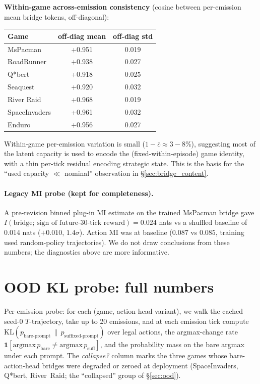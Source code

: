 \documentclass[11pt]{article}
\begin{document}
\smallskip\noindent\textbf{Within-game across-emission consistency} (cosine between per-emission mean bridge tokens, off-diagonal):

\smallskip\noindent
\begin{tabular}{lcc}
\toprule
Game & off-diag mean & off-diag std \\
\midrule
MsPacman      & +0.951 & 0.019 \\
RoadRunner    & +0.938 & 0.027 \\
Q*bert        & +0.918 & 0.025 \\
Seaquest      & +0.920 & 0.032 \\
River Raid    & +0.968 & 0.019 \\
SpaceInvaders & +0.961 & 0.032 \\
Enduro        & +0.956 & 0.027 \\
\bottomrule
\end{tabular}\smallskip

Within-game per-emission variation is small ($1{-}\bar{c}\approx 3{-}8\%$), suggesting most of the latent capacity is used to encode the (fixed-within-episode) game identity, with a thin per-tick residual encoding strategic state. This is the basis for the ``used capacity $\ll$ nominal'' observation in \S\ref{sec:bridge_content}.

\paragraph{Legacy MI probe (kept for completeness).} A pre-revision binned plug-in MI estimate on the trained MsPacman bridge gave $I(\text{bridge};\,\text{sign of future-30-tick reward})=0.024$ nats vs a shuffled baseline of 0.014 nats ($+0.010$, $1.4\sigma$). Action MI was at baseline ($0.087$ vs $0.085$, training used random-policy trajectories). We do not draw conclusions from these numbers; the diagnostics above are more informative.

\section{OOD KL probe: full numbers}
\label{app:ood_kl}

Per-emission probe: for each (game, action-head variant), we walk the cached seed-0 $T$-trajectory, take up to 20 emissions, and at each emission tick compute $\mathrm{KL}\!\left(p_{\text{bare-prompt}} \,\|\, p_{\text{suffixed-prompt}}\right)$ over legal actions, the argmax-change rate $\mathbf{1}\!\left[\mathrm{argmax}\,p_{\text{bare}} \neq \mathrm{argmax}\,p_{\text{suff}}\right]$, and the probability mass on the bare argmax under each prompt. The \emph{collapse?} column marks the three games whose bare-action-head bridges were degraded or zeroed at deployment (SpaceInvaders, Q*bert, River~Raid; the ``collapsed'' group of \S\ref{sec:ood}).
\end{document}
